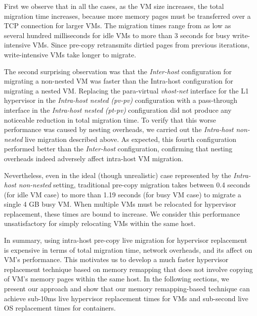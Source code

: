 First we observe that in all the cases, as the VM size increases, 
the total migration time increases, because more memory pages must be transferred 
over a TCP connection for larger VMs. The migration times range from as low
as several hundred milliseconds for idle VMs to more than 3 seconds for 
busy write-intensive VMs. Since pre-copy retransmits dirtied pages from 
previous iterations, write-intensive VMs take longer to migrate.

The second surprising observation was that the {\em Inter-host} configuration  
for migrating a non-nested VM was faster than the {Intra-host}
configuration for migrating a nested VM. Replacing the para-virtual
{\em vhost-net} interface for the L1 hypervisor in the {\em Intra-host nested (pv-pv)} configuration with 
a pass-through interface in the {\em Intra-host nested (pt-pv)} configuration did not produce any noticeable
reduction in total migration time. 
To verify that this worse performance was caused by nesting overheads,
we carried out the {\em Intra-host non-nested} live migration described above. 
As expected, this fourth configuration performed better than the {\em Inter-host} 
configuration, confirming that nesting overheads indeed adversely affect 
intra-host VM migration.

Nevertheless, even in the ideal (though unrealistic) 
case represented by the {\em Intra-host non-nested} setting, 
traditional pre-copy migration takes between 0.4 seconds (for idle VM case)
to more than 1.19 seconds (for busy VM case) to migrate a single 4 GB busy VM. 
When multiple VMs must be relocated for hypervisor replacement, these 
times are bound to increase. We consider this performance unsatisfactory
for simply relocating VMs within the same host.

In summary, using intra-host pre-copy live migration for hypervisor 
replacement is expensive in terms of total migration time, network
overheads, and its affect on VM's performance. 
This motivates us to develop a much faster hypervisor replacement
technique based on memory remapping that does not involve copying of 
VM's memory pages within the same host. In the following sections,
we present our approach and show that our memory remapping-based
technique can achieve sub-10ms live hypervisor replacement times for VMs
and sub-second live OS replacement times for containers.


